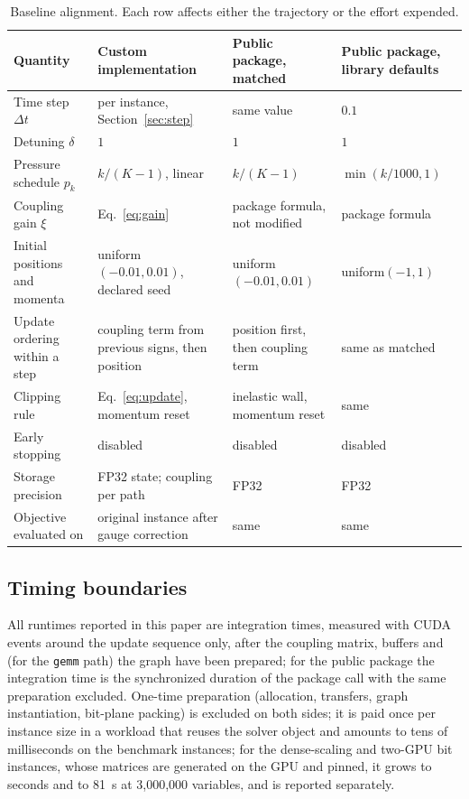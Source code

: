 \documentclass[11pt,a4paper]{article}
\newcommand{\code}[1]{\texttt{#1}}
\begin{document}
\begin{table}[!ht]\centering\small
\caption{Baseline alignment. Each row affects either the trajectory or the effort expended.}
\label{tab:align}
\begin{tabularx}{\linewidth}{lXXX}\toprule
Quantity & Custom implementation & Public package, matched & Public package, library defaults \\
\midrule
Time step $\Delta t$              & per instance, Section~\ref{sec:step} & same value & $0.1$ \\
Detuning $\delta$                 & $1$        & $1$ & $1$ \\
Pressure schedule $p_k$           & $k/(K-1)$, linear & $k/(K-1)$ & $\min(k/1000,1)$ \\
Coupling gain $\xi$               & Eq.~\eqref{eq:gain}    & package formula, not modified & package formula \\
Initial positions and momenta     & uniform$(-0.01,0.01)$, declared seed & uniform$(-0.01,0.01)$ & uniform$(-1,1)$ \\
Update ordering within a step     & coupling term from previous signs, then position & position first, then coupling term & same as matched \\
Clipping rule                     & Eq.~\eqref{eq:update}, momentum reset & inelastic wall, momentum reset & same \\
Early stopping                    & disabled   & disabled & disabled \\
Storage precision                 & FP32 state; coupling per path & FP32 & FP32 \\
Objective evaluated on            & original instance after gauge correction & same & same \\
\bottomrule
\end{tabularx}
\end{table}

\subsection{Timing boundaries}\label{sec:boundaries}
All runtimes reported in this paper are integration times, measured with CUDA events around the update sequence only, after the coupling matrix, buffers and (for the \code{gemm} path) the graph have been prepared; for the public package the integration time is the synchronized duration of the package call with the same preparation excluded. One-time preparation (allocation, transfers, graph instantiation, bit-plane packing) is excluded on both sides; it is paid once per instance size in a workload that reuses the solver object and amounts to tens of milliseconds on the benchmark instances; for the dense-scaling and two-GPU bit instances, whose matrices are generated on the GPU and pinned, it grows to seconds and to 81~s at 3,000,000 variables, and is reported separately.
\end{document}
